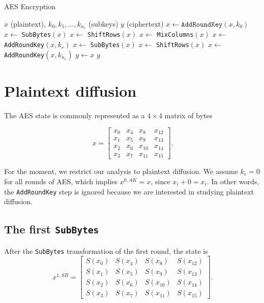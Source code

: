 \documentclass{report}
\begin{document}
\begin{algorithm}[H]
\caption{AES Encryption}
\begin{algorithmic}
\Require $x$ (plaintext), $k_0, k_1, \ldots, k_{n_r}$ (subkeys)
\Ensure $y$ (ciphertext)
\State $x \leftarrow \texttt{AddRoundKey}(x, k_0)$
        \State $x \leftarrow$ \texttt{SubBytes}$(x)$
        \State $x \leftarrow$ \texttt{ShiftRows}$(x)$
        \State $x \leftarrow$ \texttt{MixColumns}$(x)$
        \State $x \leftarrow$ \texttt{AddRoundKey}$(x, k_r)$
  \EndFor
\State $x \leftarrow$ \texttt{SubBytes}$(x)$
\State $x \leftarrow$ \texttt{ShiftRows}$(x)$
\State $x \leftarrow$ \texttt{AddRoundKey}$(x, k_{n_r})$
\State $y \leftarrow x$
\State \Return $y$
\end{algorithmic}
\label{alg:aes-encryption}
\end{algorithm}

\section{Plaintext diffusion}
The AES state is commonly represented as a $4\times4$ matrix of bytes

\begin{equation*}
x =
\begin{bmatrix}
x_0 & x_4 & x_8 & x_{12}\\
x_1 & x_5 & x_9 & x_{13}\\
x_2 & x_6 & x_{10} & x_{14}\\
x_3 & x_7 & x_{11} & x_{15}
\end{bmatrix}.
\end{equation*}

For the moment, we restrict our analysis to plaintext diffusion. We assume $k_r = 0$ for all rounds of AES, which implies $x^{0, AK} = x$, since $x_i + 0 = x_i$. In other words, the \texttt{AddRoundKey} step is ignored because we are interested in studying plaintext diffusion.

\subsection{The first \texttt{SubBytes}}

After the \texttt{SubBytes} transformation of the first round, the state is
\begin{equation*}
x^{1, SB} =
\begin{bmatrix}
S(x_0) & S(x_4) & S(x_8) & S(x_{12})\\
S(x_1) & S(x_5) & S(x_9) & S(x_{13})\\
S(x_2) & S(x_6) & S(x_{10}) & S(x_{14})\\
S(x_3) & S(x_7) & S(x_{11}) & S(x_{15})
\end{bmatrix}.
\end{equation*}
\end{document}
